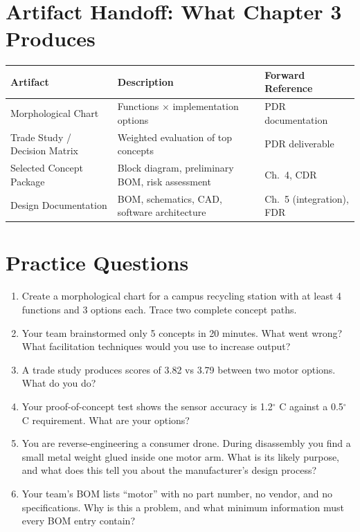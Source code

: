 \documentclass[11pt,letterpaper,twoside,openany]{book}
\begin{document}
\section{Artifact Handoff: What Chapter 3 Produces}
\begin{table}[htbp]\centering\small
\begin{tabularx}{\textwidth}{l X l}
\toprule
\textbf{Artifact} & \textbf{Description} & \textbf{Forward Reference} \\
\midrule
Morphological Chart & Functions $\times$ implementation options & PDR documentation \\
Trade Study / Decision Matrix & Weighted evaluation of top concepts & PDR deliverable \\
Selected Concept Package & Block diagram, preliminary BOM, risk assessment & Ch.~4, CDR \\
Design Documentation & BOM, schematics, CAD, software architecture & Ch.~5 (integration), FDR \\
\bottomrule
\end{tabularx}
\end{table}

\section{Practice Questions}
\begin{enumerate}[leftmargin=1.5em]
\item Create a morphological chart for a campus recycling station with at least 4 functions and 3 options each. Trace two complete concept paths.
\item Your team brainstormed only 5 concepts in 20 minutes. What went wrong? What facilitation techniques would you use to increase output?
\item A trade study produces scores of 3.82 vs 3.79 between two motor options. What do you do?
\item Your proof-of-concept test shows the sensor accuracy is 1.2$^{\circ}$ C against a 0.5$^{\circ}$ C requirement. What are your options?
\item You are reverse-engineering a consumer drone. During disassembly you find a small metal weight glued inside one motor arm. What is its likely purpose, and what does this tell you about the manufacturer's design process?
\item Your team's BOM lists ``motor'' with no part number, no vendor, and no specifications. Why is this a problem, and what minimum information must every BOM entry contain?
\end{enumerate}
\end{document}
